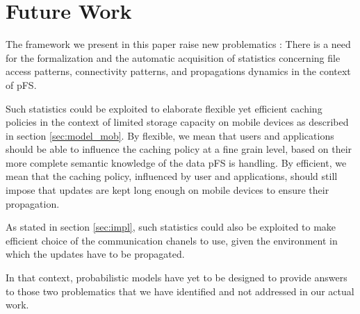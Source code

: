 
\section{Future Work}
\label{sec:futwk}

The framework we present in this paper raise new problematics : There
is a need for the formalization and the automatic acquisition of
statistics concerning file access patterns, connectivity patterns, and
propagations dynamics in the context of pFS.

Such statistics could be exploited to elaborate flexible yet efficient
caching policies in the context of limited storage capacity on mobile
devices as described in section \ref{sec:model_mob}. By flexible, we mean
that users and applications should be able to influence the caching
policy at a fine grain level, based on their more complete semantic
knowledge of the data pFS is handling. By efficient, we mean that the
caching policy, influenced by user and applications, should still
impose that updates are kept long enough on mobile devices to ensure
their propagation.

As stated in section \ref{sec:impl}, such statistics could also be
exploited to make efficient choice of the communication chanels to
use, given the environment in which the updates have to be propagated.

In that context, probabilistic models have yet to be designed to
provide answers to those two problematics that we have identified and
not addressed in our actual work.


